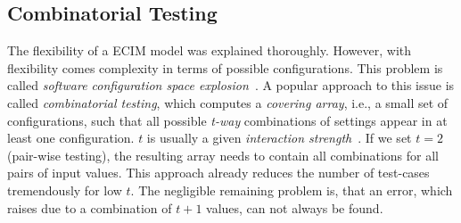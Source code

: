 \subsection{Combinatorial Testing}\label{subsec:combinatorial-testing}

The flexibility of a ECIM model was explained thoroughly. However, with flexibility comes complexity in terms of possible configurations. 
This problem is called \emph{software configuration space explosion}~\cite{interaction-patterns}. A popular approach to this issue is called \emph{combinatorial testing}, which computes a \emph{covering array}, i.e., a small set of configurations, such that all possible \emph{t-way} combinations of settings appear in at least one configuration. $t$ is usually a given \emph{interaction strength}~\cite{interaction-patterns}. 
If we set $t=2$ (pair-wise testing), the resulting array needs to contain all combinations for all pairs of input values. 
This approach already reduces the number of test-cases tremendously for low $t$. The negligible remaining problem is, that an error, which raises due to a combination of $t+1$ values, can not always be found.


